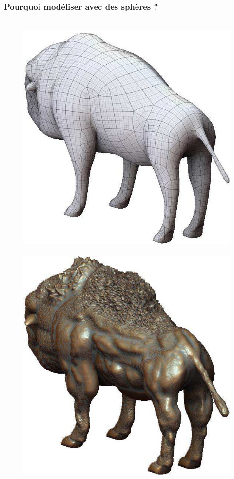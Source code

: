 \documentclass[9pt]{beamer}
\begin{document}
\begin{frame}
	\frametitle{Pourquoi modéliser avec des sphères ?}
	\begin{figure}[H]
		\centering
		\leavevmode
  		\hbox{
  			\includegraphics[scale=0.2]{images/basemesh.jpg}
  			\hspace*{0.5cm} 
     		\includegraphics[scale=0.2]{images/detailedmesh.jpg}
     		\hspace*{0.5cm}  
  		}
	\end{figure}
\end{frame}
\end{document}
